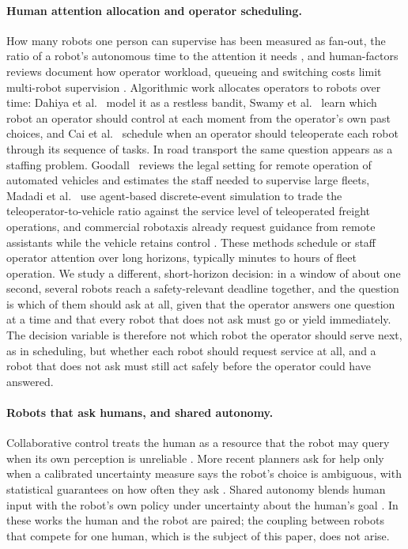 \documentclass[a4paper,fleqn]{cas-dc}
\begin{document}
\paragraph{Human attention allocation and operator scheduling.}
How many robots one person can supervise has been measured as fan-out, the ratio of a robot's autonomous time to the attention it needs \citep{olsen2004fanout}, and human-factors reviews document how operator workload, queueing and switching costs limit multi-robot supervision \citep{chen2014teaming}. Algorithmic work allocates operators to robots over time: Dahiya et al.~\cite{Dahiya2022} model it as a restless bandit, Swamy et al.~\cite{swamy2020scaled} learn which robot an operator should control at each moment from the operator's own past choices, and Cai et al.~\cite{cai2022scheduling} schedule when an operator should teleoperate each robot through its sequence of tasks. In road transport the same question appears as a staffing problem. Goodall~\cite{goodall2020non} reviews the legal setting for remote operation of automated vehicles and estimates the staff needed to supervise large fleets,
Madadi et al.~\cite{madadi2026agent} use agent-based discrete-event simulation to trade the teleoperator-to-vehicle ratio against the service level of teleoperated freight operations, and commercial robotaxis already request guidance from remote assistants while the vehicle retains control \cite{Waymo2024}. These methods schedule or staff operator attention over long horizons, typically minutes to hours of fleet operation. We study a different, short-horizon decision: in a window of about one second, several robots reach a safety-relevant deadline together, and the question is which of them should ask at all, given that the operator answers one question at a time and that every robot that does not ask must go or yield immediately. The decision variable is therefore not which robot the operator should serve next, as in scheduling, but whether each robot should request service at all, and a robot that does not ask must still act safely before the operator could have answered.

\paragraph{Robots that ask humans, and shared autonomy.}
Collaborative control treats the human as a resource that the robot may query when its own perception is unreliable \citep{fong2003asker}. More recent planners ask for help only when a calibrated uncertainty measure says the robot's choice is ambiguous, with statistical guarantees on how often they ask \citep{ren2023knowno}. Shared autonomy blends human input with the robot's own policy under uncertainty about the human's goal \citep{javdani2018shared}. In these works the human and the robot are paired; the coupling between robots that compete for one human, which is the subject of this paper, does not arise.
\end{document}
